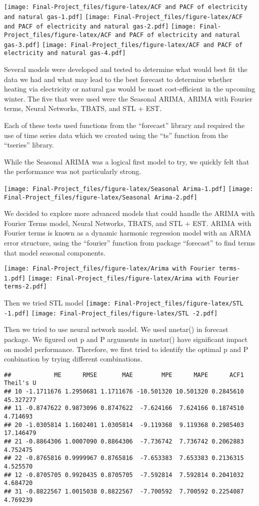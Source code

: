 \documentclass[
]{article}
\begin{document}
\texttt{[image: Final-Project\_files/figure-latex/ACF and PACF of electricity and natural gas-1.pdf]}
\texttt{[image: Final-Project\_files/figure-latex/ACF and PACF of electricity and natural gas-2.pdf]}
\texttt{[image: Final-Project\_files/figure-latex/ACF and PACF of electricity and natural gas-3.pdf]}
\texttt{[image: Final-Project\_files/figure-latex/ACF and PACF of electricity and natural gas-4.pdf]}

Several models were developed and tested to determine what would best
fit the data we had and what may lead to the best forecast to determine
whether heating via electricity or natural gas would be most
cost-efficient in the upcoming winter. The five that were used were the
Seasonal ARIMA, ARIMA with Fourier terms, Neural Networks, TBATS, and
STL + EST.

Each of these tests used functions from the ``forecast'' library and
required the use of time series data which we created using the ``ts''
function from the ``tseries'' library.

While the Seasonal ARIMA was a logical first model to try, we quickly
felt that the performance was not particularly strong.

\texttt{[image: Final-Project\_files/figure-latex/Seasonal Arima-1.pdf]}
\texttt{[image: Final-Project\_files/figure-latex/Seasonal Arima-2.pdf]}

We decided to explore more advanced models that could handle the ARIMA
with Fourier Terms model, Neural Networks, TBATS, and STL + EST. ARIMA
with Fourier terms is known as a dynamic harmonic regression model with
an ARMA error structure, using the ``fourier'' function from package
``forecast'' to find terms that model seasonal components.

\texttt{[image: Final-Project\_files/figure-latex/Arima with Fourier terms-1.pdf]}
\texttt{[image: Final-Project\_files/figure-latex/Arima with Fourier terms-2.pdf]}

Then we tried STL model
\texttt{[image: Final-Project\_files/figure-latex/STL -1.pdf]}
\texttt{[image: Final-Project\_files/figure-latex/STL -2.pdf]}

Then we tried to use neural network model. We used nnetar() in forecast
package. We figured out p and P arguments in nnetar() have significant
impact on model performance. Therefore, we first tried to identify the
optimal p and P conbination by trying different combinations.

\begin{verbatim}
##            ME      RMSE       MAE        MPE      MAPE      ACF1 Theil's U
## 10 -1.1711676 1.2950681 1.1711676 -10.501320 10.501320 0.2845610 45.327277
## 11 -0.8747622 0.9873096 0.8747622  -7.624166  7.624166 0.1874510  4.714693
## 20 -1.0305814 1.1602401 1.0305814  -9.119368  9.119368 0.2985403 17.146479
## 21 -0.8864306 1.0007090 0.8864306  -7.736742  7.736742 0.2062883  4.752475
## 22 -0.8765816 0.9999967 0.8765816  -7.653383  7.653383 0.2136315  4.525570
## 12 -0.8705705 0.9920435 0.8705705  -7.592814  7.592814 0.2041032  4.684720
## 31 -0.8822567 1.0015038 0.8822567  -7.700592  7.700592 0.2254087  4.769239
\end{verbatim}
\end{document}
